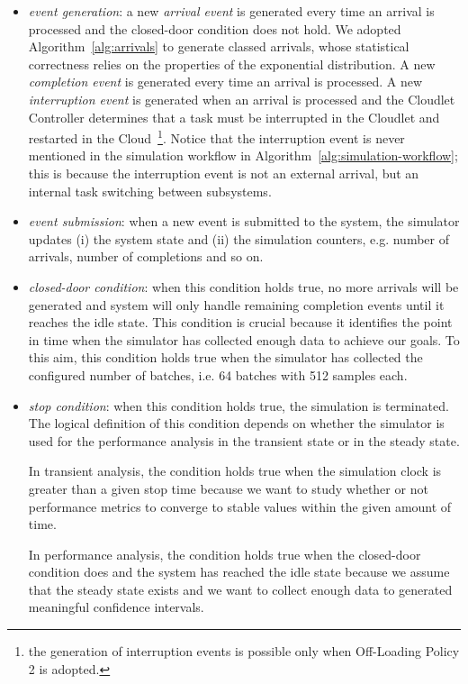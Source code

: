 \begin{itemize}
	
	\item \textit{event generation}: a new \textit{arrival event} is generated every time an arrival is processed and the closed-door condition does not hold. We adopted Algorithm~\ref{alg:arrivals} to generate classed arrivals, whose statistical correctness relies on the properties of the exponential distribution.
	A new \textit{completion event} is generated every time an arrival is processed.
	A new \textit{interruption event} is generated when an arrival is processed and the Cloudlet Controller determines that a task must be interrupted in the Cloudlet and restarted in the Cloud~\footnote{the generation of interruption events is possible only when Off-Loading Policy 2 is adopted.}.
	Notice that the interruption event is never mentioned in the simulation workflow in Algorithm~\ref{alg:simulation-workflow}; this is because the interruption event is not an external arrival, but an internal task switching between subsystems.
	
	\item \textit{event submission}: when a new event is submitted to the system, the simulator updates (i) the system state and (ii) the simulation counters, e.g. number of arrivals, number of completions and so on.
	
	\item \textit{closed-door condition}: when this condition holds true, no more arrivals will be generated and system will only handle remaining completion events until it reaches the idle state. 
	This condition is crucial because it identifies the point in time when the simulator has collected enough data to achieve our goals. 
	To this aim, this condition holds true when the simulator has collected the configured number of batches, i.e. 64 batches with 512 samples each.
	
	\item \textit{stop condition}: when this condition holds true, the simulation is terminated. The logical definition of this condition depends on whether the simulator is used for the performance analysis in the transient state or in the steady state.
	
	In transient analysis, the condition holds true when the simulation clock is greater than a given stop time because we want to study whether or not performance metrics to converge to stable values within the given amount of time.
	
	In performance analysis, the condition holds true when the closed-door condition does and the system has reached the idle state because we assume that the steady state exists and we want to collect enough data to generated meaningful confidence intervals.
	

\end{itemize}
